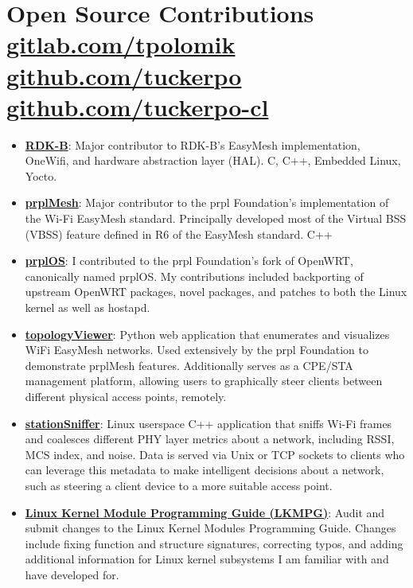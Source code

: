 \documentclass[letterpaper,11pt]{article}
\newcommand{\resumeSubHeadingListStart}{\begin{itemize}[leftmargin=*]}
\newcommand{\resumeSubHeadingListEnd}{\end{itemize}}
\begin{document}
	\section{Open Source Contributions \href{https://gitlab.com/tpolomik}{\small gitlab.com/tpolomik} \href{https://github.com/tuckerpo}{\small github.com/tuckerpo} \href{https://github.com/tuckerpo-cl}{\small github.com/tuckerpo-cl}}
	\resumeSubHeadingListStart
	\item{
	\textbf{\href{https://github.com/tuckerpo-cl}{RDK-B}}{: Major contributor to RDK-B's EasyMesh implementation, OneWifi, and hardware abstraction layer (HAL). C, C++, Embedded Linux, Yocto.}
}
	\item{
		\textbf{\href{https://gitlab.com/prpl-foundation/prplmesh/prplMesh}{prplMesh}}{: Major contributor to the prpl Foundation's implementation of the Wi-Fi EasyMesh standard. Principally developed most of the Virtual BSS (VBSS) feature defined in R6 of the EasyMesh standard. C++}
	}
	\item{
		\textbf{\href{https://gitlab.com/prpl-foundation/prplos}{prplOS}}{: I contributed to the prpl Foundation's fork of OpenWRT, canonically named prplOS. My contributions included backporting of upstream OpenWRT packages, novel packages, and patches to both the Linux kernel as well as hostapd.}	
	}
	\item{
		\textbf{\href{https://gitlab.com/prpl-foundation/prplmesh/topologyviewer}{topologyViewer}}{: Python web application that enumerates and visualizes WiFi EasyMesh networks. Used extensively by the prpl Foundation to demonstrate prplMesh features. Additionally serves as a CPE/STA management platform, allowing users to graphically steer clients between different physical access points, remotely.}	
	}
	\item{
		\textbf{\href{https://gitlab.com/prpl-foundation/prplmesh/stationsniffer}{stationSniffer}}{: Linux userspace C++ application that sniffs Wi-Fi frames and coalesces different PHY layer metrics about a network, including RSSI, MCS index, and noise. Data is served via Unix or TCP sockets to clients who can leverage this metadata to make intelligent decisions about a network, such as steering a client device to a more suitable access point.}
	}
	\item{
		\textbf{\href{https://github.com/sysprog21/lkmpg/blob/master/contrib.tex}{Linux Kernel Module Programming Guide (LKMPG)}}{: Audit and submit changes to the Linux Kernel Modules Programming Guide. Changes include fixing function and structure signatures, correcting typos, and adding additional information for Linux kernel subsystems I am familiar with and have developed for.}
	}
	\resumeSubHeadingListEnd
	
\end{document}
